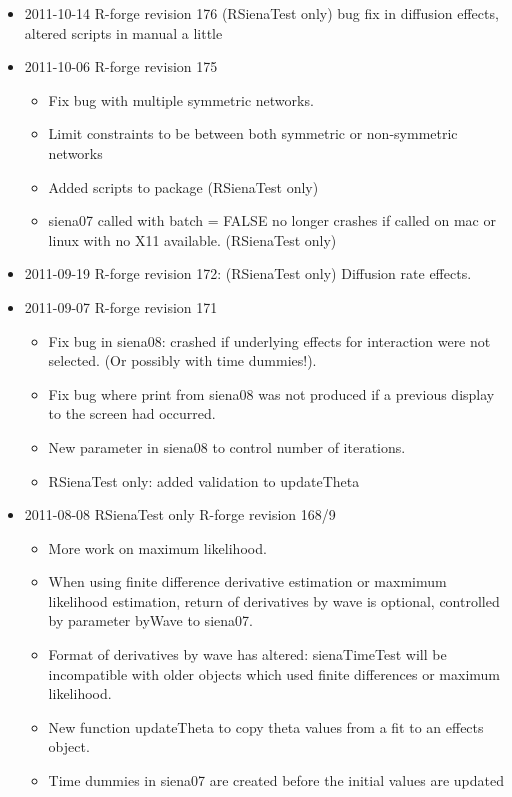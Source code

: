 \documentclass[a4paper,fleqn,11pt]{article}
\newcommand{\+}{\, + \,}
\newcommand{\sfn}[1]{\textsf{#1}}
\begin{document}
\begin{small}
\begin{itemize}
\item 2011-10-14 R-forge revision 176 (RSienaTest only)
bug fix in diffusion effects, altered scripts in manual a little
\item 2011-10-06 R-forge revision 175
\begin{itemize}
\item Fix bug with multiple symmetric networks.
\item Limit constraints to be between both symmetric or non-symmetric networks
\item Added scripts to package (RSienaTest only)
\item\textsf{siena07} called with batch = FALSE no longer crashes if called on mac or
linux with no X11 available. (RSienaTest only)
\end{itemize}
\item 2011-09-19 R-forge revision 172: (RSienaTest only) Diffusion rate effects.
\item 2011-09-07 R-forge revision 171
\begin{itemize}
\item Fix bug in siena08: crashed if underlying effects for interaction were not
  selected. (Or possibly with time dummies!).
\item Fix bug where print from \textsf{siena08} was not produced if a previous display to
  the screen had occurred.
\item New parameter in \textsf{siena08} to control number of iterations.
\item \textsf{RSienaTest} only: added validation to updateTheta
\end{itemize}
\item 2011-08-08 \textsf{RSienaTest} only R-forge revision 168/9
\begin{itemize}
\item More work on maximum likelihood.
\item When using finite difference derivative estimation or maxmimum likelihood
  estimation, return of derivatives by wave is optional, controlled by parameter
  byWave to \textsf{siena07}.
\item Format of derivatives by wave has altered: \textsf{sienaTimeTest} will be
  incompatible with older objects which used finite differences or maximum
  likelihood.
\item New function \sfn{updateTheta} to copy theta values from a fit to an
  effects object.
\item Time dummies in \textsf{siena07} are created before the initial values are updated

\end{itemize}
\end{itemize}
\end{small}
\end{document}
